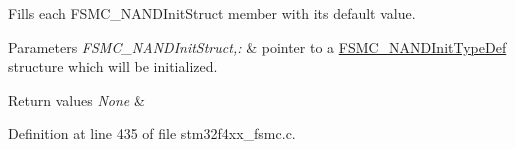 Fills each F\-S\-M\-C\-\_\-\-N\-A\-N\-D\-Init\-Struct member with its default value. 


\begin{DoxyParams}{Parameters}
{\em F\-S\-M\-C\-\_\-\-N\-A\-N\-D\-Init\-Struct,\-:} & pointer to a \hyperlink{struct_f_s_m_c___n_a_n_d_init_type_def}{F\-S\-M\-C\-\_\-\-N\-A\-N\-D\-Init\-Type\-Def} structure which will be initialized. \\
\hline
\end{DoxyParams}

\begin{DoxyRetVals}{Return values}
{\em None} & \\
\hline
\end{DoxyRetVals}


Definition at line 435 of file stm32f4xx\-\_\-fsmc.\-c.

